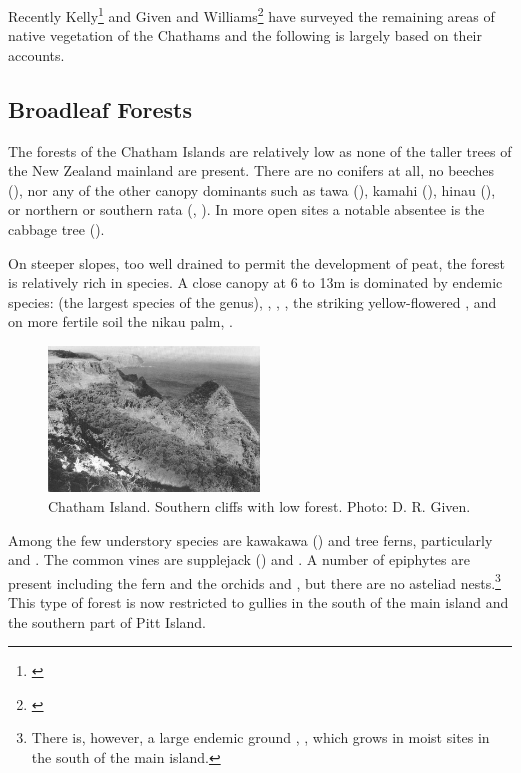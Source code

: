 Recently Kelly\footnote{\cite{kelly1983distribution}} and Given and Williams\footnote{\cite{given1984conservation}} have surveyed the remaining areas of native vegetation of the Chathams and the following is largely based on their accounts.

\subsection{Broadleaf Forests}

The forests of the Chatham Islands are relatively low as none of the taller trees of the New Zealand mainland are present.
There are no conifers at all, no beeches (), nor any of the other canopy dominants such as tawa (), kamahi (), hinau (), or northern or southern rata (, ).
In more open sites a notable absentee is the cabbage tree ().

On steeper slopes, too well drained to permit the development of peat, the forest is relatively rich in species.
A close canopy at 6 to 13m is dominated by endemic species:  (the largest species of the genus), , , , the striking yellow-flowered , and on more fertile soil the nikau palm, .

\begin{figure}
	\includegraphics[width=0.5\textwidth]{graphics/figure118chatham-island.jpg}
	\centering
	\caption[Chatham Island, southern cliffs]{Chatham Island.
    Southern cliffs with low forest.
	Photo: D. R. Given.}
	\label{fig:118chatham-island}
\end{figure}

Among the few understory species are kawakawa () and tree ferns, particularly  and .
The common vines are supplejack () and .
A number of epiphytes are present including the fern  and the orchids  and , but there are no asteliad nests.\footnote{There is, however, a large endemic ground , , which grows in moist sites in the south of the main island.}
This type of forest is now restricted to gullies in the south of the main island and the southern part of Pitt Island.

